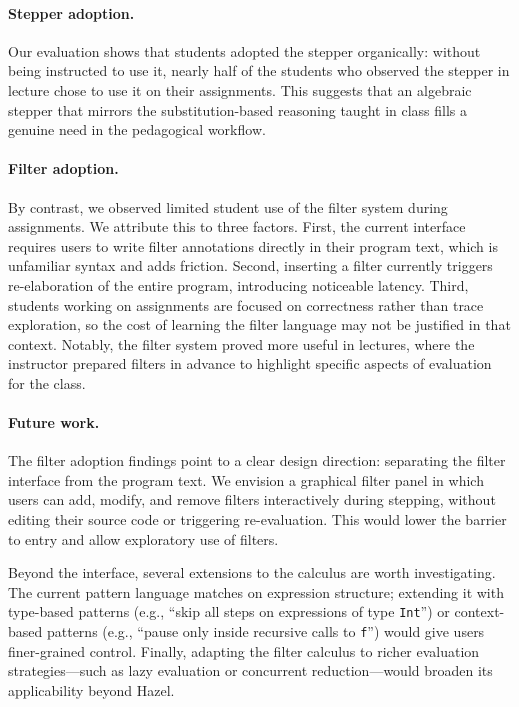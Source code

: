 \documentclass[acmsmall,anonymous]{acmart}
\begin{document}
\paragraph{Stepper adoption.}
Our evaluation shows that students adopted the stepper organically:
without being instructed to use it, nearly half of the students who
observed the stepper in lecture chose to use it on their assignments.
This suggests that an algebraic stepper that mirrors the
substitution-based reasoning taught in class fills a genuine need
in the pedagogical workflow.

\paragraph{Filter adoption.}
By contrast, we observed limited student use of the filter system
during assignments. We attribute this to three factors. First, the
current interface requires users to write filter annotations directly
in their program text, which is unfamiliar syntax and adds friction.
Second, inserting a filter currently triggers re-elaboration of the
entire program, introducing noticeable latency. Third, students
working on assignments are focused on correctness rather than trace
exploration, so the cost of learning the filter language may not be
justified in that context. Notably, the filter system proved more
useful in lectures, where the instructor prepared filters in advance
to highlight specific aspects of evaluation for the class.

\paragraph{Future work.}
The filter adoption findings point to a clear design direction:
separating the filter interface from the program text. We envision
a graphical filter panel in which users can add, modify, and remove
filters interactively during stepping, without editing their source
code or triggering re-evaluation. This would lower the barrier to
entry and allow exploratory use of filters.

Beyond the interface, several extensions to the calculus are worth
investigating. The current pattern language matches on expression
structure; extending it with type-based patterns (e.g., ``skip all
steps on expressions of type \texttt{Int}'') or context-based
patterns (e.g., ``pause only inside recursive calls to \texttt{f}'')
would give users finer-grained control. Finally, adapting the filter
calculus to richer evaluation strategies---such as lazy evaluation or
concurrent reduction---would broaden its applicability beyond Hazel.




\appendix



\end{document}
